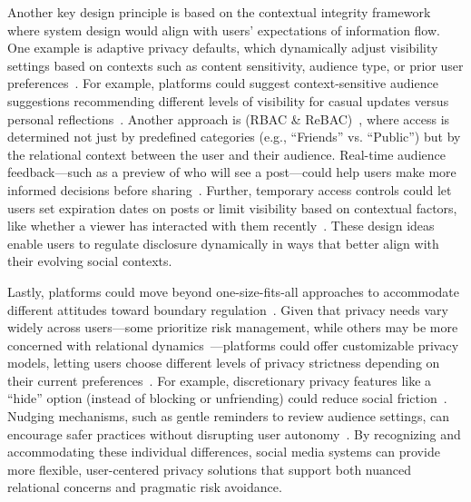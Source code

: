 Another key design principle is based on the contextual integrity framework~\cite{nissenbaum2004privacy} where system design would align with users' expectations of information flow. One example is adaptive privacy defaults, which dynamically adjust visibility settings based on contexts such as content sensitivity, audience type, or prior user preferences~\cite{Acquisti2017-ez, Wisniewski-2015-GiveSocialWant-z}. For example, platforms could suggest context-sensitive audience suggestions recommending different levels of visibility for casual updates versus personal reflections~\cite{Mondal-2019-MovingBeyondMedia-p, Sleeper-2013-PostWasntFacebook-m}. Another approach is  (RBAC \& ReBAC)~\cite{Paci-2019-SurveyAccessSystems-a}, where access is determined not just by predefined categories (e.g., ``Friends'' vs. ``Public'') but by the relational context between the user and their audience. Real-time audience feedback---such as a preview of who will see a post---could help users make more informed decisions before sharing~\cite{Acquisti-2017-NudgesPrivacyOnline-y, Paci-2019-SurveyAccessSystems-a}. Further, temporary access controls could let users set expiration dates on posts or limit visibility based on contextual factors, like whether a viewer has interacted with them recently~\cite{Ayalon-2013-RetrospectivePrivacyNetworks-t, Schnitzler-2020-SoKManagingData-h, Mondal-2019-MovingBeyondMedia-p}. These design ideas enable users to regulate disclosure dynamically in ways that better align with their evolving social contexts.

Lastly, platforms could move beyond one-size-fits-all approaches to accommodate different attitudes toward boundary regulation~\cite{Wisniewski-2015-GiveSocialWant-z, Stutzman2012-ev}. Given that privacy needs vary widely across users---some prioritize risk management, while others may be more concerned with relational dynamics~\cite{Page-2019-PragmaticToolFeatures-p, Wisniewski-2015-GiveSocialWant-z}---platforms could offer customizable privacy models, letting users choose different levels of privacy strictness depending on their current preferences~\cite{Colnago-2023-ThereReverseBehaviors-j}. For example, discretionary privacy features like a ``hide'' option (instead of blocking or unfriending) could reduce social friction~\cite{Page-2019-PragmaticToolFeatures-p}. Nudging mechanisms, such as gentle reminders to review audience settings, can encourage safer practices without disrupting user autonomy~\cite{Acquisti-2017-NudgesPrivacyOnline-y, Agha2023-dv, Agha2023-mu}. By recognizing and accommodating these individual differences, social media systems can provide more flexible, user-centered privacy solutions that support both nuanced relational concerns and pragmatic risk avoidance.